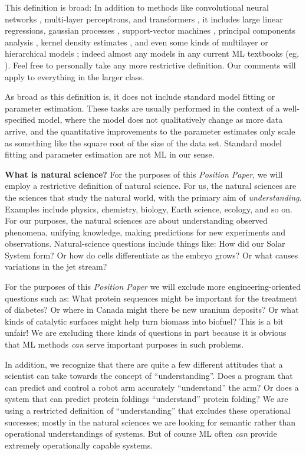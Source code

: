 \documentclass{article}
\newcommand{\documentname}{\textsl{Position Paper}}
\renewcommand{\paragraph}[1]{\noindent\par\textbf{#1}}
\begin{document}
This definition is broad:
In addition to methods like convolutional neural networks \cite{cnn}, multi-layer perceptrons, and transformers \cite{transformer}, it includes large linear regressions, gaussian processes \cite{gp}, support-vector machines \cite{svm}, principal components analysis \cite{pca}, kernel density estimates \cite{kde}, and even some kinds of multilayer or hierarchical models \cite{multilevel}; indeed almost any models in any current ML textbooks (eg, \citealt{ml_book1, ml_book2}).
Feel free to personally take any more restrictive definition.
Our comments will apply to everything in the larger class.

As broad as this definition is, it does not include standard model fitting or parameter estimation.
These tasks are usually performed in the context of a well-specified model, where the model does not qualitatively change as more data arrive, and the quantitative improvements to the parameter estimates only scale as something like the square root of the size of the data set.
Standard model fitting and parameter estimation are not ML in our sense.

\paragraph{What is natural science?}
For the purposes of this \documentname, we will employ a restrictive definition of natural science.
For us, the natural sciences are the sciences that study the natural world, with the primary aim of \emph{understanding}.
Examples include physics, chemistry, biology, Earth science, ecology, and so on.
For our purposes, the natural sciences are about understanding observed phenomena, unifying knowledge, making predictions for new experiments and observations.
Natural-science questions include things like:
How did our Solar System form?
Or how do cells differentiate as the embryo grows?
Or what causes variations in the jet stream?

For the purposes of this \documentname{} we will exclude more engineering-oriented questions such as: What protein sequences might be important for the treatment of diabetes? Or where in Canada might there be new uranium deposits? Or what kinds of catalytic surfaces might help turn biomass into biofuel?
This is a bit unfair!
We are excluding these kinds of questions in part because it is obvious that ML methods \emph{can} serve important purposes in such problems.

In addition, we recognize that there are quite a few different attitudes that a scientist can take towards the concept of ``understanding''.
Does a program that can predict and control a robot arm accurately ``understand'' the arm?
Or does a system that can predict protein foldings ``understand'' protein folding?
We are using a restricted definition of ``understanding'' that excludes these operational successes; mostly in the natural sciences we are looking for semantic rather than operational understandings of systems.
But of course ML often \emph{can} provide extremely operationally capable systems.
\end{document}
